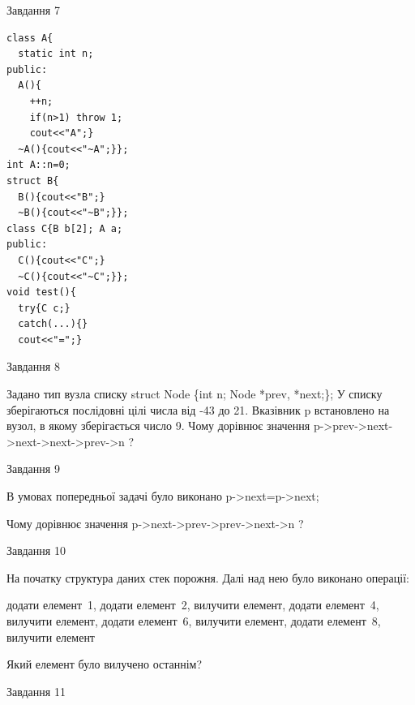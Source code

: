 \documentclass[12pt, ukrainian]{article}
\begin{document}
{{{{\begin{minipage}[t]{7cm}
               
{\begin{center}Завдання {7}\end{center}}
\vspace{-6mm}

\begin{verbatim}
class A{
  static int n;
public:
  A(){
    ++n; 
    if(n>1) throw 1;
    cout<<"A";}
  ~A(){cout<<"~A";}};
int A::n=0;
struct B{
  B(){cout<<"B";}
  ~B(){cout<<"~B";}};
class C{B b[2]; A a;
public:
  C(){cout<<"C";}
  ~C(){cout<<"~C";}};
void test(){
  try{C c;} 
  catch(...){} 
  cout<<"=";}
\end{verbatim}            


\end{minipage}
               
{\begin{center}Завдання {8}\end{center}}
\vspace{-6mm}
Задано тип вузла списку
struct Node \{int n; Node *prev, *next;\};
У списку зберігаються послідовні цілі числа від -43 до 21. Вказівник p встановлено на вузол, в якому зберігається число 9.
Чому дорівнює значення p->prev->next->next->next->prev->n ?\par

               
{\begin{center}Завдання {9}\end{center}}
\vspace{-6mm}
В умовах попередньої задачі було виконано p->next=p->next;

Чому дорівнює значення p->next->prev->prev->next->n ?\par

\newpage
               
{\begin{center}Завдання {10}\end{center}}
\vspace{-6mm}
На початку структура даних стек порожня. Далі над нею було виконано операції:

додати елемент~1, додати елемент~2, вилучити елемент, додати елемент~4, вилучити елемент, додати елемент~6, вилучити елемент, додати елемент~8, вилучити елемент

Який елемент було вилучено останнім?\par

               
{\begin{center}Завдання {11}\end{center}}
\vspace{-6mm}

}}}}
\end{document}
